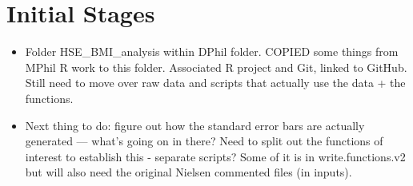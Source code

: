 \documentclass[]{article}
\begin{document}
\section{Initial Stages}
\begin{itemize}
\item Folder HSE\_BMI\_analysis within DPhil folder. COPIED some things from MPhil R work to this folder. Associated R project and Git, linked to GitHub. Still need to move over raw data and scripts that actually use the data + the functions.
\item Next thing to do: figure out how the standard error bars are actually generated --- what's going on in there? Need to split out the functions of interest to establish this - separate scripts? Some of it is in write.functions.v2 but will also need the original Nielsen commented files (in inputs).
\end{itemize}
\end{document}
